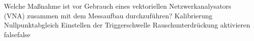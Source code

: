     {Welche Maßnahme ist vor Gebrauch eines vektoriellen Netzwerkanalysators (VNA) zusammen mit dem Messaufbau durchzuführen?}
    {Kalibrierung}
    {Nullpunktabgleich}
    {Einstellen der Triggerschwelle}
    {Rauschunterdrückung aktivieren}
    {false}{false}